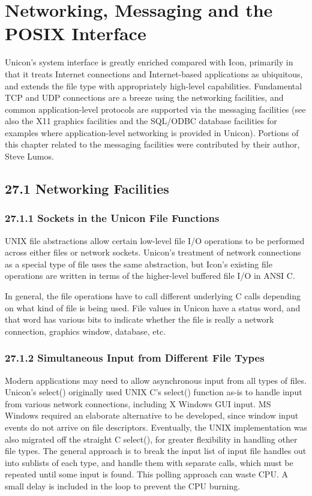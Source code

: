 \chapter{Networking, Messaging and the POSIX Interface}

Unicon's system interface is greatly enriched compared with Icon,
primarily in that it treats Internet connections and Internet-based
applications as ubiquitous, and extends the file type with
appropriately high-level capabilities.  Fundamental TCP and UDP
connections are a breeze using the networking facilities, and common
application-level protocols are supported via the messaging facilities
(see also the X11 graphics facilities and the SQL/ODBC database
facilities for examples where application-level networking is provided
in Unicon). Portions of this chapter related to the messaging
facilities were contributed by their author, Steve Lumos.

\section[27.1 Networking Facilities]{27.1 Networking Facilities}

\subsection[27.1.1 Sockets in the Unicon File Functions]{27.1.1 Sockets in the Unicon File Functions}

UNIX file abstractions allow certain low-level file I/O
operations to be performed across either files or network sockets.
Unicon's treatment of network connections as a special type of file
uses the same abstraction, but Icon's existing file operations are
written in terms of the higher-level buffered file I/O in ANSI C.

In general, the file operations have to call different underlying C calls 
depending on what kind of file is being used.  File values in Unicon
have a status word, and that word has various bits to indicate whether
the file is really a network connection, graphics window, database, etc.

\subsection[27.1.2 Simultaneous Input from Different File Types]{27.1.2 Simultaneous Input from Different File Types}

Modern applications may need to allow asynchronous input from all
types of files. Unicon's select() originally used UNIX C's select()
function as-is to handle input from various network connections,
including X Windows GUI input.  MS Windows required an elaborate
alternative to be developed, since window input events do not
arrive on file descriptors.  Eventually, the UNIX implementation
was also migrated off the straight C select(), for greater flexibility
in handling other file types.  The general approach is to break the
input list of input file handles out into sublists of each type, and
handle them with separate calls, which must be repeated until some
input is found.  This polling approach can waste CPU. A small delay
is included in the loop to prevent the CPU burning.


